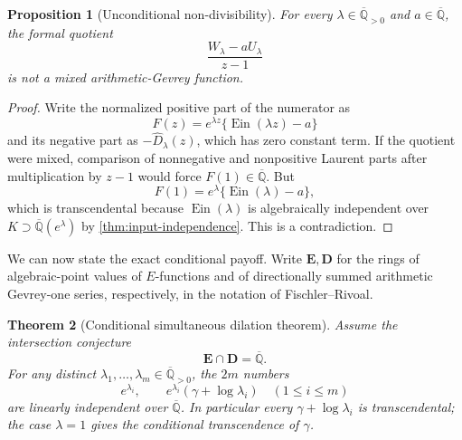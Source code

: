 \documentclass[11pt]{article}
\theoremstyle{keio}
\newtheorem{theorem}{Theorem}[section]
\newtheorem{proposition}[theorem]{Proposition}
\theoremstyle{definition}
\theoremstyle{remark}
\newcommand{\Qbar}{\overline{\mathbb Q}}
\newcommand{\Ein}{\operatorname{Ein}}
\begin{document}
\begin{proposition}[Unconditional non-divisibility]
\label{prop:mixed-nondivisibility}
For every \(\lambda\in\Qbar_{>0}\) and \(a\in\Qbar\), the formal quotient
\begin{equation}\label{eq:mixed-quotient}
 \frac{W_\lambda-aU_\lambda}{z-1}
\end{equation}
is not a mixed arithmetic-Gevrey function.
\end{proposition}

\begin{proof}
Write the normalized positive part of the numerator as
\[
 F(z)=e^{\lambda z}\{\Ein(\lambda z)-a\}
\]
and its negative part as \(-\widehat D_\lambda(z)\), which has zero constant
term.  If the quotient were mixed, comparison of nonnegative and
nonpositive Laurent parts after multiplication by \(z-1\) would force
\(F(1)\in\Qbar\).  But
\[
 F(1)=e^\lambda\{\Ein(\lambda)-a\},
\]
which is transcendental because \(\Ein(\lambda)\) is algebraically
independent over \(K\supset\Qbar(e^\lambda)\) by
\cref{thm:input-independence}.  This is a contradiction.
\end{proof}

We can now state the exact conditional payoff.  Write
\(\mathbf E,\mathbf D\) for the rings of algebraic-point values of
\(E\)-functions and of directionally summed arithmetic Gevrey-one series,
respectively, in the notation of Fischler--Rivoal.

\begin{theorem}[Conditional simultaneous dilation theorem]
\label{thm:conditional-mixed-dilations}
Assume the intersection conjecture
\begin{equation}\label{eq:ED-intersection}
 \mathbf E\cap\mathbf D=\Qbar.
\end{equation}
For any distinct
\(\lambda_1,\ldots,\lambda_m\in\Qbar_{>0}\), the \(2m\) numbers
\begin{equation}\label{eq:mixed-dilation-values}
 \boxed{\displaystyle
 e^{\lambda_i},\qquad
 e^{\lambda_i}(\gamma+\log\lambda_i)
 \quad(1\le i\le m)}
\end{equation}
are linearly independent over \(\Qbar\).  In particular every
\(\gamma+\log\lambda_i\) is transcendental; the case \(\lambda=1\) gives
the conditional transcendence of \(\gamma\).
\end{theorem}
\end{document}
